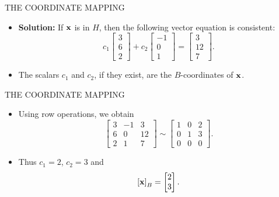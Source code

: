 \begin{frame}{THE COORDINATE MAPPING}
\begin{itemize}
\item \textbf{Solution:} If $\mathbf{x}$ is in $H$, then the following vector equation is consistent:
\[
c_1\begin{bmatrix}3\\6\\2\end{bmatrix}
+c_2\begin{bmatrix}-1\\0\\1\end{bmatrix}
=\begin{bmatrix}3\\12\\7\end{bmatrix}.
\]
\item The scalars $c_1$ and $c_2$, if they exist, are the $B$-coordinates of $\mathbf{x}$.
\end{itemize}
\end{frame}

\begin{frame}{THE COORDINATE MAPPING}
\begin{itemize}
\item Using row operations, we obtain
\[
\begin{bmatrix}3&-1&3\\6&0&12\\2&1&7\end{bmatrix}
\sim
\begin{bmatrix}1&0&2\\0&1&3\\0&0&0\end{bmatrix}.
\]
\item Thus $c_1=2$, $c_2=3$ and
\[
\left[\mathbf{x}\right]_{B}=\begin{bmatrix}2\\3\end{bmatrix}.
\]
\end{itemize}
\end{frame}

